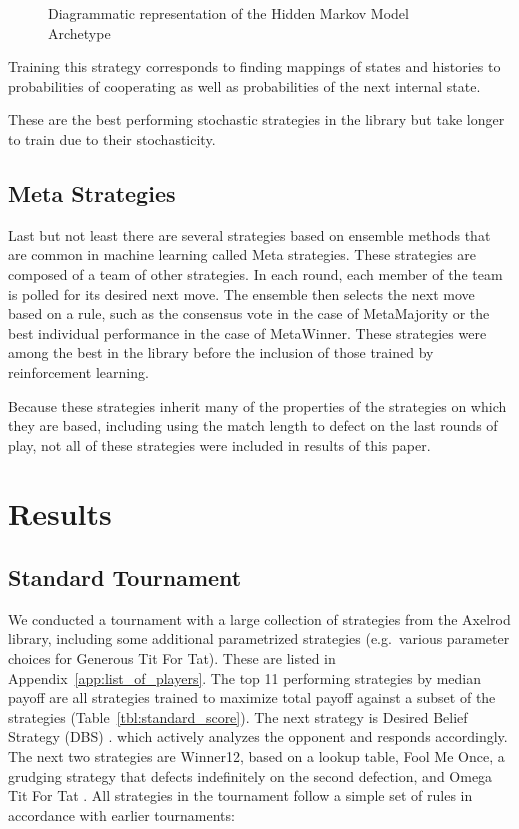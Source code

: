 \documentclass{article}
\begin{document}
\begin{figure}[!hbtp]
    \centering
    
    \caption{Diagrammatic representation of the Hidden Markov Model Archetype}
    \label{fig:hmm}
\end{figure}

Training this strategy corresponds to finding mappings of states and histories
to probabilities of cooperating as well as probabilities of the next internal
state.

These are the best performing stochastic strategies
in the library but take longer to train due to their stochasticity.

\subsection{Meta Strategies}

Last but not least there are several strategies based on ensemble methods that
are common in machine learning called Meta strategies. These strategies are
composed of a team of other strategies. In each round, each member of the team
is polled for its desired next
move. The ensemble then selects the next move based on a rule, such as the
consensus vote in the case of MetaMajority or the best individual performance
in the case of MetaWinner. These strategies were among the best in the library
before the inclusion of those trained by reinforcement learning.

Because these strategies inherit many of the properties of the strategies
on which they are based, including using the match length to defect on the last
rounds of play, not all of these strategies were included in results of this
paper.

\section{Results}\label{sec:results}

\subsection{Standard Tournament}

We conducted a tournament with a large collection of strategies from the Axelrod
library, including some additional parametrized strategies (e.g.\ various parameter
choices for Generous Tit For Tat). These are listed in
Appendix~\ref{app:list_of_players}.
The top 11 performing strategies by median payoff are all strategies trained to maximize
total payoff against a subset of the strategies (Table~\ref{tbl:standard_score}).
The next strategy is Desired Belief Strategy (DBS) \cite{Au2006}.
which actively analyzes the opponent and responds
accordingly. The next two strategies are Winner12, based on a lookup table,
Fool Me Once, a grudging strategy that defects indefinitely on
the second defection, and Omega Tit For Tat \cite{kendall2007iterated}.
All strategies in the tournament follow a simple set of
rules in accordance with earlier tournaments:
\end{document}
